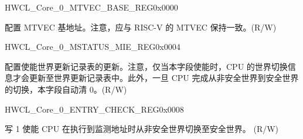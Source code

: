 \begin{register}{H}{WCL\_Core\_0\_MTVEC\_BASE\_REG}{0x0000}\label{regdesc:WCLCORE0MTVECBASEREG}
%
\regnewline%
\begin{regdesc}\begin{reglist}
\label{fielddesc:WCLCORE0MTVECBASE}\item [WCL\_CORE\_0\_MTVEC\_BASE] 配置 MTVEC 基地址。注意，应与 RISC-V 的 MTVEC 保持一致。(R/W)
\end{reglist}\end{regdesc}
\end{register}


\begin{register}{H}{WCL\_Core\_0\_MSTATUS\_MIE\_REG}{0x0004}\label{regdesc:WCLCORE0MSTATUSMIEREG}
%
%
\regnewline%
\begin{regdesc}\begin{reglist}
\label{fielddesc:WCLCORE0MSTATUSMIE}\item [WCL\_CORE\_0\_MSTATUS\_MIE] 配置使能世界更新记录表的更新。注意，仅当本字段使能时，CPU 的世界切换信息才会更新至世界更新记录表中。此外，一旦 CPU 完成从非安全世界到安全世界的切换，本字段自动清 0。(R/W)
\end{reglist}\end{regdesc}
\end{register}


\begin{register}{H}{WCL\_Core\_0\_ENTRY\_CHECK\_REG}{0x0008}\label{regdesc:WCLCORE0ENTRYCHECKREG}
%
\regnewline%
\begin{regdesc}\begin{reglist}
\label{fielddesc:WCLCORE0ENTRYCHECK}\item [WCL\_CORE\_0\_ENTRY\_CHECK] 写 1 使能 CPU 在执行到监测地址时从非安全世界切换至安全世界。
(R/W)
\end{reglist}\end{regdesc}
\end{register}










